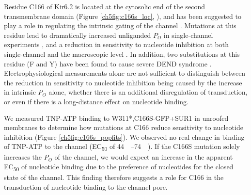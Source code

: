 Residue C166 of Kir6.2 is located at the cytosolic end of the second transmembrane domain (Figure \ref{ch5fig:c166s_loc}, \cite{lee_molecular_2017, martin_anti-diabetic_2017, li_structure_2017, puljung_cryo-electron_2018-1}), and has been suggested to play a role in regulating the intrinsic gating of the channel \cite{gloyn_kcnj11_2006, trapp_molecular_1998, ribalet_atp-sensitive_2006, yang_palmitoylation_2020, loussouarn_structure_2000, enkvetchakul_kinetic_2000}.
Mutations at this residue lead to dramatically increased unliganded $P_O$ in single-channel experiments \cite{trapp_molecular_1998, enkvetchakul_kinetic_2000, ribalet_atp-sensitive_2006}, and a reduction in sensitivity to nucleotide inhibition at both single-channel and the macroscopic level \cite{trapp_molecular_1998, enkvetchakul_kinetic_2000, ribalet_atp-sensitive_2006, li_decomposition_2013, yang_palmitoylation_2020}.
In addition, two substitutions at this residue (F and Y) have been found to cause severe DEND syndrome \cite{gloyn_kcnj11_2006}.
Electrophysiological measurements alone are not sufficient to distinguish between the reduction in sensitivity to nucleotide inhibition being caused by the increase in intrinsic $P_O$ alone, whether there is an additional disregulation of transduction, or even if there is a long-distance effect on nucleotide binding.

We measured TNP-ATP binding to W311*,C166S-GFP+SUR1 in unroofed membranes to determine how mutations at C166 reduce sensitivity to nucleotide inhibition (Figure \ref{ch5fig:c166s_popfits}).
We observed no real change in binding of TNP-ATP to the channel (EC\textsubscript{50} of \SIrange{44}{74}{\micro\Molar}).
If the C166S mutation solely increases the $P_O$ of the channel, we would expect an increase in the apparent EC\textsubscript{50} of nucleotide binding due to the preference of nucleotides for the closed state of the channel.
This finding therefore suggests a role for C166 in the transduction of nucleotide binding to the channel pore.

